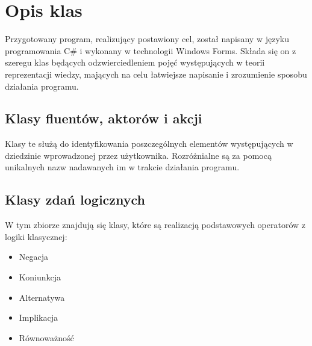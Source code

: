 \documentclass{article}
\begin{document}
\section{Opis klas}
Przygotowany program, realizujący postawiony cel, został napisany w języku programowania C\# i wykonany w technologii Windows Forms. Składa się on z szeregu klas będących odzwierciedleniem pojęć występujących w teorii reprezentacji wiedzy, mających na celu łatwiejsze napisanie i zrozumienie sposobu działania programu. 

\subsection{Klasy fluentów, aktorów i akcji}
Klasy te służą do identyfikowania poszczególnych elementów występujących w dziedzinie wprowadzonej przez użytkownika. Rozróżnialne są za pomocą unikalnych nazw nadawanych im w trakcie działania programu.

\subsection{Klasy zdań logicznych}
W tym zbiorze znajdują się klasy, które są realizacją podstawowych operatorów z logiki klasycznej:
\begin{itemize}
    \item Negacja
    \item Koniunkcja
    \item Alternatywa
    \item Implikacja
    \item Równoważność
\end{itemize}
\end{document}
